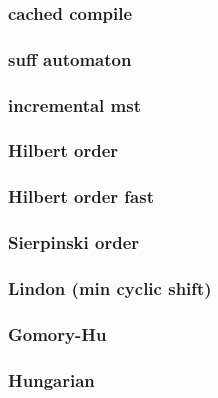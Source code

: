 \documentclass[a4paper,twocolumn]{article}
\begin{document}
\subsubsection{cached compile}



\subsubsection{suff automaton}


\subsubsection{incremental mst}


\subsubsection{Hilbert order}


\subsubsection{Hilbert order fast}


\subsubsection{Sierpinski order}


\subsubsection{Lindon (min cyclic shift)}


\subsubsection{Gomory-Hu}


% 

\subsubsection{Hungarian}

\end{document}
